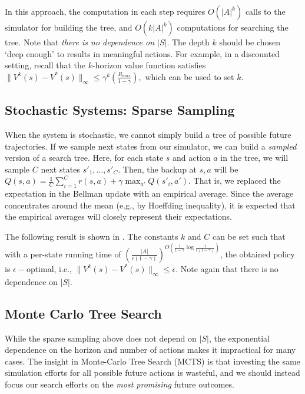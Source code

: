 In this approach, the computation in each step requires $O(|A|^{k})$ calls to the simulator for building the tree, and $O(k|A|^{k})$ computations for searching the tree. Note that \emph{there is no dependence on $|S|$}. The depth $k$ should be chosen `deep enough' to results in meaningful actions. For example, in a discounted setting, recall that the $k$-horizon value function satisfies 
$\|V^k(s)-V^*(s)\|_\infty \leq \gamma^k\left( \frac{R_{max}}{1-\gamma}\right),$ which can be used to set $k$.

\subsection{Stochastic Systems: Sparse Sampling}
When the system is stochastic, we cannot simply build a tree of possible future trajectories. If we sample next states from our simulator, we can build a \emph{sampled} version of a search tree. Here, for each state $s$ and action $a$ in the tree, we will sample $C$ next states $s'_1,\dots,s'_C$. Then, the backup at $s,a$ will be $Q(s,a) = \frac{1}{C}\sum_{i=1}^C r(s,a) + \gamma \max_{a'} Q(s'_i,a')$.
That is, we replaced the expectation in the Bellman update with an empirical average. Since the average concentrates around the mean (e.g., by Hoeffding inequality), it is expected that the empirical averages will closely represent their expectations.

The following result is shown in \cite{kearns2002sparse}. The constants $k$ and $C$ can be set such that with a per-state running time of $(\frac{|A|}{\epsilon (1-\gamma)})^{O\left(\frac{1}{1-\gamma}\log \frac{1}{\epsilon (1-\gamma)}\right)}$, the obtained policy is $\epsilon-$optimal, i.e., $\|V^k(s)-V^*(s)\|_\infty \leq \epsilon$. Note again that there is no dependence on $|S|$.

\subsection{Monte Carlo Tree Search}
While the sparse sampling above does not depend on $|S|$, the exponential dependence on the horizon and number of actions makes it impractical for many cases. The insight in Monte-Carlo Tree Search (MCTS) is that investing the same simulation efforts for all possible future actions is wasteful, and we should instead focus our search efforts on the \emph{most promising} future outcomes.


